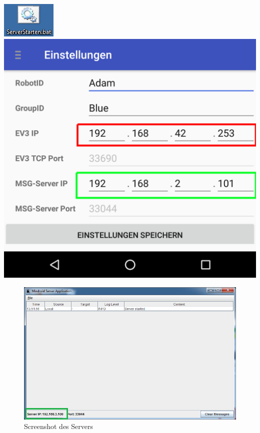 \documentclass[
	12pt,
	colorbacktitle,
	accentcolor=tud1c,
	draft,
	twoside,
	german
]{tudexercise}
\begin{document}
\begin{enumerate}
\begin{minipage}{.47\textwidth}
	\centering
	\includegraphics[width=.4\textwidth]{img/pc_serverbat.png}
	\includegraphics[width=.8\textwidth]{img/app_settings_short.png}
	\label{fig:app_settings}
	\end{minipage}
	\begin{center}
	\begin{figure}
	\includegraphics[width=.9\textwidth]{img/pc_server.png}
	\caption{Screenshot des Servers}
	\label{fig:server}
	\end{figure}
	
	\end{center}	

	
	
	\end{enumerate}
	
\end{document}
